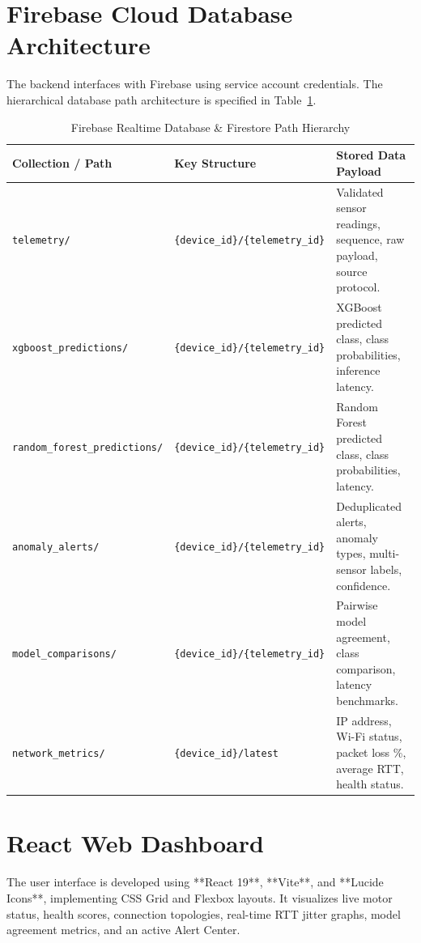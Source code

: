 \documentclass[12pt,a4paper]{report}
\begin{document}
\section{Firebase Cloud Database Architecture}
The backend interfaces with Firebase using service account credentials. The hierarchical database path architecture is specified in Table~\ref{tab:firebase_paths}.

\begin{table}[H]
\centering
\small
\caption{Firebase Realtime Database & Firestore Path Hierarchy}
\label{tab:firebase_paths}
\begin{tabularx}{\textwidth}{l p{5.5cm} X}
\toprule
\textbf{Collection / Path} & \textbf{Key Structure} & \textbf{Stored Data Payload} \\
\midrule
\texttt{telemetry/} & \texttt{\{device\_id\}/\{telemetry\_id\}} & Validated sensor readings, sequence, raw payload, source protocol. \\
\addlinespace
\texttt{xgboost\_predictions/} & \texttt{\{device\_id\}/\{telemetry\_id\}} & XGBoost predicted class, class probabilities, inference latency. \\
\addlinespace
\texttt{random\_forest\_predictions/} & \texttt{\{device\_id\}/\{telemetry\_id\}} & Random Forest predicted class, class probabilities, latency. \\
\addlinespace
\texttt{anomaly\_alerts/} & \texttt{\{device\_id\}/\{telemetry\_id\}} & Deduplicated alerts, anomaly types, multi-sensor labels, confidence. \\
\addlinespace
\texttt{model\_comparisons/} & \texttt{\{device\_id\}/\{telemetry\_id\}} & Pairwise model agreement, class comparison, latency benchmarks. \\
\addlinespace
\texttt{network\_metrics/} & \texttt{\{device\_id\}/latest} & IP address, Wi-Fi status, packet loss \%, average RTT, health status. \\
\bottomrule
\end{tabularx}
\end{table}

\section{React Web Dashboard}
The user interface is developed using **React 19**, **Vite**, and **Lucide Icons**, implementing CSS Grid and Flexbox layouts. It visualizes live motor status, health scores, connection topologies, real-time RTT jitter graphs, model agreement metrics, and an active Alert Center.
\end{document}
